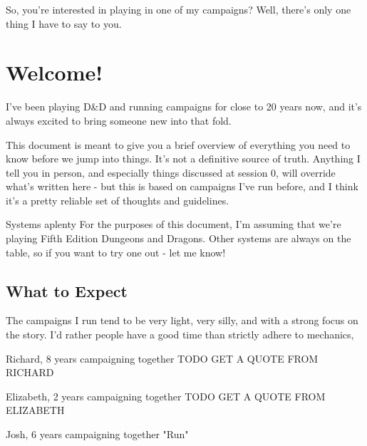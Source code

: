 \maketitle

So, you're interested in playing in one of my campaigns? Well, there's only one thing I have to say to you.

\section{Welcome!}

I've been playing D\&D and running campaigns for close to 20 years now, and it's always excited to bring someone new into that fold.

This document is meant to give you a brief overview of everything you need to know before we jump into things. It's not a definitive source of truth. Anything I tell you in person, and especially things discussed at session 0, will override what's written here - but this is based on campaigns I've run before, and I think it's a pretty reliable set of thoughts and guidelines.

\begin{DndComment}{Systems aplenty}
 For the purposes of this document, I'm assuming that we're playing Fifth Edition Dungeons and Dragons. Other systems are always on the table, so if you want to try one out - let me know!
\end{DndComment}

\subsection{What to Expect}

The campaigns I run tend to be very light, very silly, and with a strong focus on the story. I'd rather people have a good time than strictly adhere to mechanics, 

\begin{DndQuotation}{Richard, 8 years campaigning together}
TODO GET A QUOTE FROM RICHARD
\end{DndQuotation}

\begin{DndQuotation}{Elizabeth, 2 years campaigning together}
TODO GET A QUOTE FROM ELIZABETH
\end{DndQuotation}

\begin{DndQuotation}{Josh, 6 years campaigning together}
"Run"
\end{DndQuotation}

